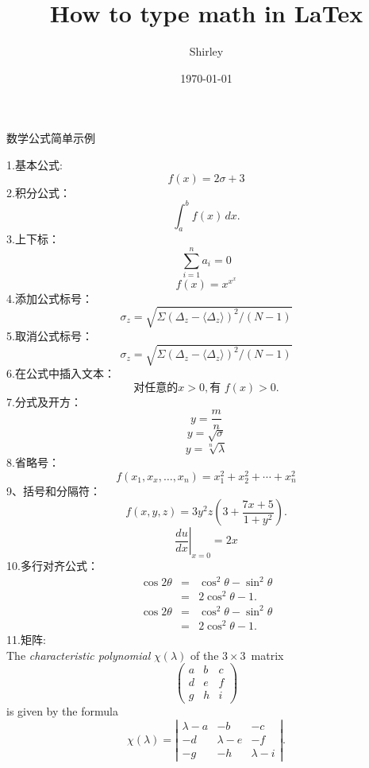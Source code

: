 \documentclass[12pt,a4paper]{article}
\title{How to type math in LaTex}
\author{Shirley}
\date{\today}
\begin{document}

\pagestyle{yang}

\begin{center}
数学公式简单示例
\end{center}

1.基本公式:
\[f(x)=2\sigma+3\]
2.积分公式：
\[ \int_a^b f(x)\,dx.\]
3.上下标：
$$\sum_{i=1}^n a_i=0$$%
$$f(x)=x^{x^x}$$%
4.添加公式标号：
\begin{equation}
\sigma_z=\sqrt{\Sigma(\Delta_z-\langle\Delta_z\rangle)^2/(N-1)}
\end{equation}
5.取消公式标号：
\begin{equation*}
\sigma_z=\sqrt{\Sigma(\Delta_z-\langle\Delta_z\rangle)^2/(N-1)}
\end{equation*}
6.在公式中插入文本：
$$\mbox{对任意的$x>0$}, \mbox{有 }f(x)>0. $$
7.分式及开方：
$$y=\frac{m}{n} $$ %
$$y=\sqrt{\sigma}$$
$$y=\sqrt[n]{\lambda}$$
8.省略号：
$$f(x_1,x_x,\ldots,x_n) = x_1^2 + x_2^2 + \cdots + x_n^2 $$
9、括号和分隔符：
\[f(x,y,z) = 3y^2 z \left( 3 + \frac{7x+5}{1 + y^2} \right).\]
 $$\left. \frac{du}{dx} \right|_{x=0}=2x$$
 10.多行对齐公式：
 \begin{eqnarray*}
\cos 2\theta & = & \cos^2 \theta - \sin^2 \theta \\
& = & 2 \cos^2 \theta - 1.
\end{eqnarray*}
 \begin{eqnarray}
\cos 2\theta & = & \cos^2 \theta - \sin^2 \theta \\
& = & 2 \cos^2 \theta - 1.
\end{eqnarray}
11.矩阵:\\
The \emph{characteristic polynomial} $\chi(\lambda)$ of the
$3 \times 3$~matrix
\[ \left( \begin{array}{ccc}
a & b & c \\
d & e & f \\
g & h & i \end{array} \right)\]
is given by the formula
\[ \chi(\lambda) = \left| \begin{array}{ccc}
\lambda - a & -b & -c \\
-d & \lambda - e & -f \\
-g & -h & \lambda - i \end{array} \right|.\]
\end{document}
